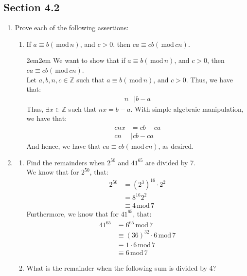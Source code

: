 \documentclass[10pt,oneside]{book}
\newcommand{\Z}{\mathbb{Z}}\newcommand{\R}{\mathbb{R}}\newcommand{\N}{\mathbb{N}}
\newcommand{\gspc}{\vspace{0.13cm}} %
\newcommand{\gline}{\gspc\\} %
\newcommand{\gmod}{\,\text{mod}\,}
\let\endoldproof\endproof
\renewenvironment{proof}[1][\proofname]
  {\vspace{0.2cm}\begin{adjustwidth}{2em}{2em}
   \oldproof[#1]}
  {\endoldproof
\end{adjustwidth}}
\begin{document}
\newcommand{\cg}[1]{\color{OliveGreen}#1\color{white}}
\newcommand{\cb}[1]{\color{BlueViolet}#1\color{white}}

\subsection*{Section 4.2}

\begin{enumerate}
	\item Prove each of the following assertions:
	\begin{enumerate}
		\item If $a\equiv b(\gmod n)$, and $c> 0$, then $ca \equiv cb(\gmod cn)$.
		\begin{proof}
			We want to show that if $a\equiv b(\gmod n)$, and $c> 0$, then $ca \equiv cb(\gmod cn)$. \gline
			Let $a,b,n,c\in\Z$ such that $a\equiv b(\gmod n)$, and $c> 0$. Thus, we have that:
			\begin{align*}
				n&\mid b- a
			\end{align*}
			Thus, $\exists x\in\Z$ such that $nx = b - a$. With simple algebraic manipulation, we have that:
			\begin{align*}
				cnx &= cb - ca\\
				cn&\mid cb - ca 
			\end{align*}
			And hence, we have that $ca \equiv cb (\gmod cn)$, as desired. 
		\end{proof}
	\end{enumerate}
	\item [4.] \begin{enumerate}
		\item Find the remainders when $2^{50}$ and $41^{65}$ are divided by 7.\gline
		We know that for $2^50$, that:
		\begin{align*}
			2^{50} &= (2^3)^{16}\cdot 2^2\\
			&= 8^{16} 2^2\\
			&\equiv 4\gmod 7
		\end{align*}
		Furthermore, we know that for $41^65$, that:
		\begin{align*}
			41^{65}&\equiv 6^{65}\gmod 7\\
			&\equiv (36)^{32}\cdot 6 \gmod 7\\
			&\equiv 1\cdot 6 \gmod 7\\
			&\equiv 6\gmod 7
		\end{align*}
		\item What is the remainder when the following sum is divided by 4?
		\begin{align*}

\end{align*}
\end{enumerate}
\end{enumerate}
\end{document}
